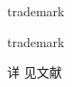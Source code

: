 \documentclass{article}
\begin{document}
trademark\textregistered{}

trademark\texttrademark{}

详\cite{lorem,lorema}
见文献

\printbibliography
\end{document}
